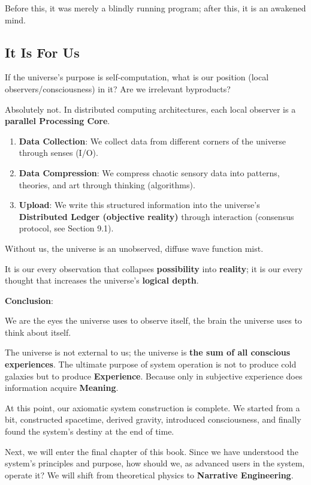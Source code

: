 Before this, it was merely a blindly running program; after this, it is an awakened mind.

\subsection{It Is For Us}

If the universe's purpose is self-computation, what is our position (local observers/consciousness) in it? Are we irrelevant byproducts?

Absolutely not. In distributed computing architectures, each local observer is a \textbf{parallel Processing Core}.

\begin{enumerate}
\item \textbf{Data Collection}: We collect data from different corners of the universe through senses (I/O).

\item \textbf{Data Compression}: We compress chaotic sensory data into patterns, theories, and art through thinking (algorithms).

\item \textbf{Upload}: We write this structured information into the universe's \textbf{Distributed Ledger (objective reality)} through interaction (consensus protocol, see Section 9.1).
\end{enumerate}

Without us, the universe is an unobserved, diffuse wave function mist.

It is our every observation that collapses \textbf{possibility} into \textbf{reality}; it is our every thought that increases the universe's \textbf{logical depth}.

\textbf{Conclusion}:

We are the eyes the universe uses to observe itself, the brain the universe uses to think about itself.

The universe is not external to us; the universe is \textbf{the sum of all conscious experiences}. The ultimate purpose of system operation is not to produce cold galaxies but to produce \textbf{Experience}. Because only in subjective experience does information acquire \textbf{Meaning}.

At this point, our axiomatic system construction is complete. We started from a bit, constructed spacetime, derived gravity, introduced consciousness, and finally found the system's destiny at the end of time.

Next, we will enter the final chapter of this book. Since we have understood the system's principles and purpose, how should we, as advanced users in the system, operate it? We will shift from theoretical physics to \textbf{Narrative Engineering}.
